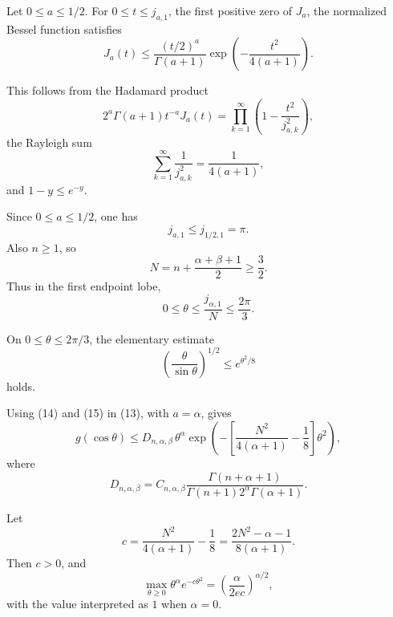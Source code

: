 \documentclass[11pt]{article}
\begin{document}
Let \(0\le a\le1/2\). For \(0\le t\le j_{a,1}\), the first positive zero of \(J_a\), the normalized Bessel function satisfies
\begin{equation}
\boxed{
J_a(t)
\le
\frac{(t/2)^a}{\Gamma(a+1)}
\exp\!\left(-\frac{t^2}{4(a+1)}\right).
}
\tag{14}
\end{equation}

This follows from the Hadamard product
\begin{equation*}
2^a\Gamma(a+1)t^{-a}J_a(t)
=
\prod_{k=1}^{\infty}
\left(1-\frac{t^2}{j_{a,k}^2}\right),
\end{equation*}
the Rayleigh sum
\begin{equation*}
\sum_{k=1}^{\infty}\frac1{j_{a,k}^2}
=
\frac1{4(a+1)},
\end{equation*}
and \(1-y\le e^{-y}\).

Since \(0\le a\le1/2\), one has
\begin{equation*}
j_{a,1}\le j_{1/2,1}=\pi.
\end{equation*}
Also \(n\ge1\), so
\begin{equation*}
N=n+\frac{\alpha+\beta+1}{2}\ge\frac32.
\end{equation*}
Thus in the first endpoint lobe,
\begin{equation*}
0\le \theta\le \frac{j_{\alpha,1}}{N}\le\frac{2\pi}{3}.
\end{equation*}

On \(0\le\theta\le2\pi/3\), the elementary estimate
\begin{equation}
\boxed{
\left(\frac{\theta}{\sin\theta}\right)^{1/2}
\le
e^{\theta^2/8}
}
\tag{15}
\end{equation}
holds.

Using (14) and (15) in (13), with \(a=\alpha\), gives
\begin{equation}
g(\cos\theta)
\le
D_{n,\alpha,\beta}\,
\theta^\alpha
\exp\!\left(
-\left[
\frac{N^2}{4(\alpha+1)}-\frac18
\right]\theta^2
\right),
\tag{16}
\end{equation}
where
\begin{equation*}
D_{n,\alpha,\beta}
=
C_{n,\alpha,\beta}
\frac{\Gamma(n+\alpha+1)}
{\Gamma(n+1)2^\alpha\Gamma(\alpha+1)}.
\end{equation*}

Let
\begin{equation*}
c=
\frac{N^2}{4(\alpha+1)}-\frac18
=
\frac{2N^2-\alpha-1}{8(\alpha+1)}.
\end{equation*}
Then \(c>0\), and
\begin{equation*}
\max_{\theta\ge0}\theta^\alpha e^{-c\theta^2}
=
\left(\frac{\alpha}{2ec}\right)^{\alpha/2},
\end{equation*}
with the value interpreted as \(1\) when \(\alpha=0\).
\end{document}
